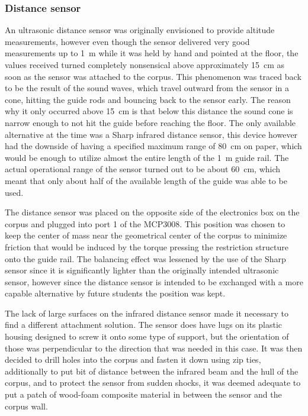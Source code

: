 \subsubsection{Distance sensor}

An ultrasonic distance sensor was originally envisioned to provide altitude measurements, however even though the sensor delivered very good measurements up to \SI{1}{\meter} while it was held by hand and pointed at the floor, the values received turned completely nonsensical above approximately \SI{15}{\centi\meter} as soon as the sensor was attached to the corpus. This phenomenon was traced back to be the result of the sound waves, which travel outward from the sensor in a cone, hitting the guide rods and bouncing back to the sensor early. The reason why it only occurred above \SI{15}{\centi\meter} is that below this distance the sound cone is narrow enough to not hit the guide before reaching the floor. The only available alternative at the time was a Sharp infrared distance sensor, this device however had the downside of having a specified maximum range of \SI{80}{\centi\meter} on paper, which would be enough to utilize almost the entire length of the \SI{1}{\meter} guide rail. The actual operational range of the sensor turned out to be about \SI{60}{\centi\meter}, which meant that only about half of the available length of the guide was able to be used.

The distance sensor was placed on the opposite side of the electronics box on the corpus and plugged into port 1 of the MCP3008. This position was chosen to keep the center of mass near the geometrical center of the corpus to minimize friction that would be induced by the torque pressing the restriction structure onto the guide rail. The balancing effect was lessened by the use of the Sharp sensor since it is significantly lighter than the originally intended ultrasonic sensor, however since the distance sensor is intended to be exchanged with a more capable alternative by future students the position was kept.

The lack of large surfaces on the infrared distance sensor made it necessary to find a different attachment solution. The sensor does have lugs on its plastic housing designed to screw it onto some type of support, but the orientation of those was perpendicular to the direction that was needed in this case. It was then decided to drill holes into the corpus and fasten it down using zip ties, additionally to put bit of distance between the infrared beam and the hull of the corpus, and to protect the sensor from sudden shocks, it was deemed adequate to put a patch of wood-foam composite material in between the sensor and the corpus wall.

